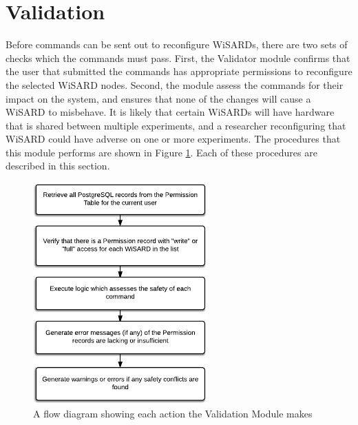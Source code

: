 \section{Validation}
Before commands can be sent out to reconfigure WiSARDs, there are two sets of checks which the commands must pass. First, the Validator module confirms that the user that submitted the commands has appropriate permissions to reconfigure the selected WiSARD nodes. Second, the module assess the commands for their impact on the system, and ensures that none of the changes will cause a WiSARD to misbehave. It is likely that certain WiSARDs will have hardware that is shared between multiple experiments, and a researcher reconfiguring that WiSARD could have adverse on one or more experiments. The procedures that this module performs are shown in Figure \ref{fig:flow_validation_module}. Each of these procedures are described in this section.\\

\begin{figure}[H]
	\centering
	\includegraphics[width=0.6\textwidth]{figures/flow_diagram_validation_module.png}
	\caption{A flow diagram showing each action the Validation Module makes}
	\label{fig:flow_validation_module}
\end{figure}

